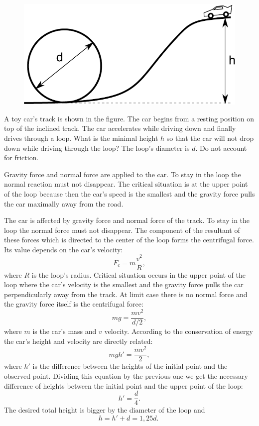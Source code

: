 \begin{figure}%
\includegraphics[width=\linewidth]{2012-v2g-05-silmus}%
\end{figure}
A toy car’s track is shown in the figure. The car begins from a resting position on top of the inclined track. The car accelerates while driving down and finally drives through a loop. What is the minimal height $h$ so that the car will not drop down while driving through the loop? The loop’s diameter is $d$. Do not account for friction.

\hinteng
Gravity force and normal force are applied to the car. To stay in the loop the normal reaction must not disappear. The critical situation is at the upper point of the loop because then the car’s speed is the smallest and the gravity force pulls the car maximally away from the road.

\solueng
The car is affected by gravity force and normal force of the track. To stay in the loop the normal force must not disappear. The component of the resultant of these forces which is directed to the center of the loop forms the centrifugal force. Its value depends on the car’s velocity:
\[F_c=m\frac{v^2}{R},\] 
where $R$ is the loop’s radius. Critical situation occurs in the upper point of the loop where the car’s velocity is the smallest and the gravity force pulls the car perpendicularly away from the track. At limit case there is no normal force and the gravity force itself is the centrifugal force:
\[ mg=\frac{mv^2}{d/2},\] 
where $m$ is the car’s mass and $v$ velocity. According to the conservation of energy the car’s height and velocity are directly related:
\[ mgh'=\frac{mv^2}{2},\]
where $h'$ is the difference between the heights of the initial point and the observed point. Dividing this equation by the previous one we get the necessary difference of heights between the initial point and the upper point of the loop:
\[ h'=\frac{d}{4}.\]
The desired total height is bigger by the diameter of the loop and
\[ h=h'+d=1,25d.\;\]
\probend